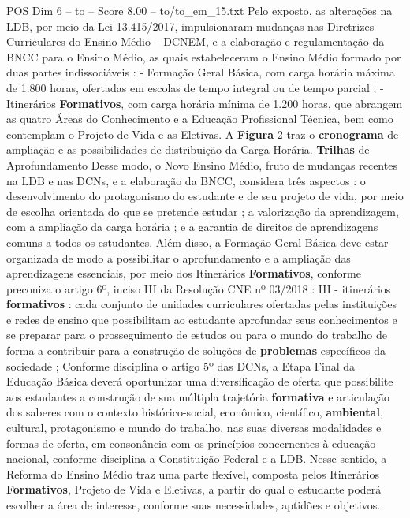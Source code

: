 \begin{textsample}{POS Dim 6 – to – Score 8.00 – to/to\_em\_15.txt}
Pelo exposto, as alterações na LDB, por meio da Lei 13.415/2017, impulsionaram mudanças nas Diretrizes Curriculares do Ensino Médio – DCNEM, e a elaboração e regulamentação da BNCC para o Ensino Médio, as quais estabeleceram o Ensino Médio formado por duas partes indissociáveis : - Formação Geral Básica, com carga horária máxima de 1.800 horas, ofertadas em escolas de tempo integral ou de tempo parcial ; - Itinerários \textbf{Formativos}, com carga horária mínima de 1.200 horas, que abrangem as quatro Áreas do Conhecimento e a Educação Profissional Técnica, bem como contemplam o Projeto de Vida e as Eletivas.
A \textbf{Figura} 2 traz o \textbf{cronograma} de ampliação e as possibilidades de distribuição da Carga Horária. \textbf{Trilhas} de Aprofundamento Desse modo, o Novo Ensino Médio, fruto de mudanças recentes na LDB e nas DCNs, e a elaboração da BNCC, considera três aspectos : o desenvolvimento do protagonismo do estudante e de seu projeto de vida, por meio de escolha orientada do que se pretende estudar ; a valorização da aprendizagem, com a ampliação da carga horária ; e a garantia de direitos de aprendizagens comuns a todos os estudantes.
Além disso, a Formação Geral Básica deve estar organizada de modo a possibilitar o aprofundamento e a ampliação das aprendizagens essenciais, por meio dos Itinerários \textbf{Formativos}, conforme preconiza o artigo 6º, inciso III da Resolução CNE nº 03/2018 : III - itinerários \textbf{formativos} : cada conjunto de unidades curriculares ofertadas pelas instituições e redes de ensino que possibilitam ao estudante aprofundar seus conhecimentos e se preparar para o prosseguimento de estudos ou para o mundo do trabalho de forma a contribuir para a construção de soluções de \textbf{problemas} específicos da sociedade ; Conforme disciplina o artigo 5º das DCNs, a Etapa Final da Educação Básica deverá oportunizar uma diversificação de oferta que possibilite aos estudantes a construção de sua múltipla trajetória \textbf{formativa} e articulação dos saberes com o contexto histórico-social, econômico, científico, \textbf{ambiental}, cultural, protagonismo e mundo do trabalho, nas suas diversas modalidades e formas de oferta, em consonância com os princípios concernentes à educação nacional, conforme disciplina a Constituição Federal e a LDB.
Nesse sentido, a Reforma do Ensino Médio traz uma parte flexível, composta pelos Itinerários \textbf{Formativos}, Projeto de Vida e Eletivas, a partir do qual o estudante poderá escolher a área de interesse, conforme suas necessidades, aptidões e objetivos.

\end{textsample}
